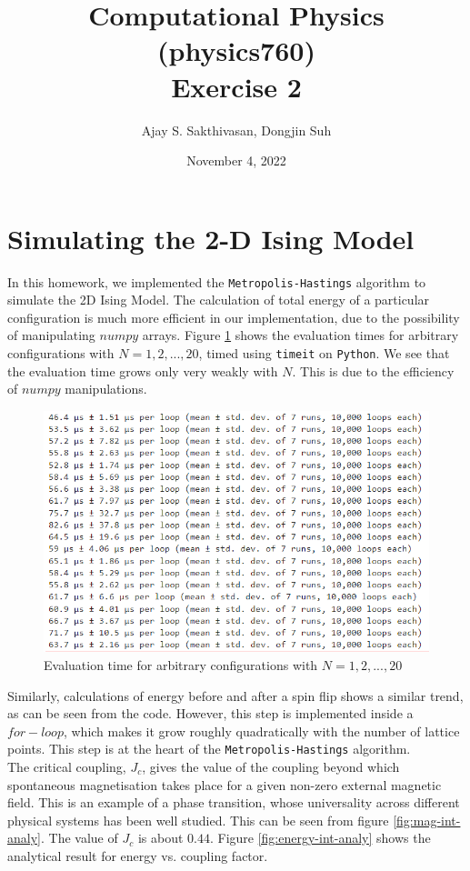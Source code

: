 \documentclass{article}
\title{Computational Physics (physics760)\\Exercise 2}
\author{Ajay S. Sakthivasan, Dongjin Suh}
\date{November 4, 2022}
\begin{document}
\maketitle

\section{Simulating the 2-D Ising Model}
In this homework, we implemented the \verb|Metropolis-Hastings| algorithm to simulate the 2D Ising Model. The calculation of total energy of a particular configuration is much more efficient in our implementation, due to the possibility of manipulating $numpy$ arrays. Figure \ref{fig:energy-calc} shows the evaluation times for arbitrary configurations with $N = 1, 2, ..., 20$, timed using \verb|timeit| on \verb|Python|. We see that the evaluation time grows only very weakly with $N$. This is due to the efficiency of $numpy$ manipulations.\\
\begin{figure}[h!]
    \centering
    \includegraphics[width=.9\textwidth]{energy-calc.png}
    \caption{Evaluation time for arbitrary configurations with $N = 1, 2, ..., 20$}
    \label{fig:energy-calc}
\end{figure}
Similarly, calculations of energy before and after a spin flip shows a similar trend, as can be seen from the code. However, this step is implemented inside a $for-loop$, which makes it grow roughly quadratically with the number of lattice points. This step is at the heart of the \verb|Metropolis-Hastings| algorithm.\\
The critical coupling, $J_c$, gives the value of the coupling beyond which spontaneous magnetisation takes place for a given non-zero external magnetic field. This is an example of a phase transition, whose universality across different physical systems has been well studied. This can be seen from figure \ref{fig:mag-int-analy}. The value of $J_c$ is about $0.44$. Figure \ref{fig:energy-int-analy} shows the analytical result for energy vs. coupling factor.\\
\end{document}
